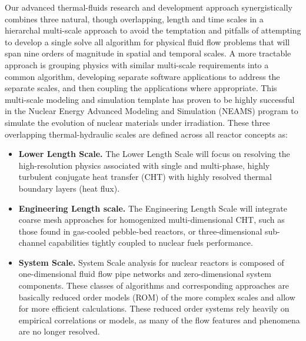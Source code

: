 Our advanced thermal-fluids research and development approach synergistically combines three natural,
though overlapping, length and time scales in a hierarchal multi-scale approach to avoid the temptation and
pitfalls of attempting to develop a single solve all algorithm for physical fluid flow problems that will span nine orders of magnitude in spatial and temporal scales. A more tractable approach is grouping physics with similar multi-scale requirements into a common algorithm, developing separate software applications to address the separate scales, and then coupling the applications where appropriate. This multi-scale modeling and simulation template has proven to be highly successful in the Nuclear Energy Advanced Modeling and Simulation (NEAMS) program to simulate the evolution of nuclear materials under irradiation. These three overlapping thermal-hydraulic scales are defined across all reactor concepts as:
\begin{itemize}
    \item \textbf{Lower Length Scale.} The Lower Length Scale will focus on resolving the high-resolution physics
    associated with single and multi-phase, highly turbulent conjugate heat transfer (CHT) with highly
    resolved thermal boundary layers (heat flux).
    \item \textbf{Engineering Length scale.} The Engineering Length Scale will integrate coarse mesh approaches
    for homogenized multi-dimensional CHT, such as those found in gas-cooled pebble-bed reactors, or three-dimensional sub-channel capabilities tightly coupled to nuclear fuels performance.
    \item \textbf{System Scale.} System Scale analysis for nuclear reactors is composed of one-dimensional fluid flow
    pipe networks and zero-dimensional system components. These classes of algorithms and corresponding approaches are basically reduced order models (ROM) of the more complex scales and allow for more efficient calculations. These reduced order systems rely heavily on empirical correlations or models, as many of the flow features and phenomena are no longer resolved.
\end{itemize}

